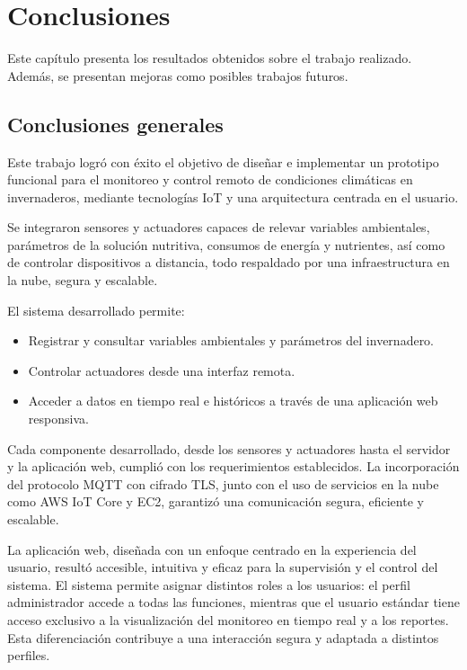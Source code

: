 \chapter{Conclusiones} %

\label{Chapter5}

Este capítulo presenta los resultados obtenidos sobre el trabajo realizado.
Además, se presentan mejoras como posibles trabajos futuros.



\section{Conclusiones generales}

Este trabajo logró con éxito el objetivo de diseñar e implementar un prototipo
funcional para el monitoreo y control remoto de condiciones climáticas en
invernaderos, mediante tecnologías IoT y una arquitectura centrada en el
usuario.

Se integraron sensores y actuadores capaces de relevar variables ambientales,
parámetros de la solución nutritiva, consumos de energía y nutrientes, así como
de controlar dispositivos a distancia, todo respaldado por una infraestructura
en la nube, segura y escalable.

El sistema desarrollado permite:
\begin{itemize}
      \item Registrar y consultar variables ambientales y parámetros del invernadero.
      \item Controlar actuadores desde una interfaz remota.
      \item Acceder a datos en tiempo real e históricos a través de una aplicación web
            responsiva.
\end{itemize}

Cada componente desarrollado, desde los sensores y actuadores hasta el servidor
y la aplicación web, cumplió con los requerimientos establecidos. La
incorporación del protocolo MQTT con cifrado TLS, junto con el uso de servicios
en la nube como AWS IoT Core y EC2, garantizó una comunicación segura,
eficiente y escalable.

La aplicación web, diseñada con un enfoque centrado en la experiencia del
usuario, resultó accesible, intuitiva y eficaz para la supervisión y el control
del sistema. El sistema permite asignar distintos roles a los usuarios: el
perfil administrador accede a todas las funciones, mientras que el usuario
estándar tiene acceso exclusivo a la visualización del monitoreo en tiempo real
y a los reportes. Esta diferenciación contribuye a una interacción segura y
adaptada a distintos perfiles.

